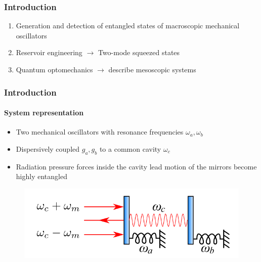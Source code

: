 \documentclass[aspectratio=43]{beamer}
\begin{document}
\begin{frame}

	\frametitle{Introduction}

	\begin{enumerate}
		\item Generation and detection of entangled states of macroscopic mechanical oscillators
		\item Reservoir engineering $\longrightarrow$ Two-mode squeezed states
		\item Quantum optomechanics $\longrightarrow$ describe mesoscopic systems
	\end{enumerate}	
	
\end{frame}

\begin{frame}

	\frametitle{Introduction}
	\framesubtitle{System representation}
	
	\begin{itemize}
		\item Two mechanical oscillators with resonance frequencies $\omega_{a}, \omega_{b}$
		\item Dispersively coupled $g_{a}, g_{b}$ to a common cavity $\omega_{c}$
		\item Radiation pressure forces inside the cavity lead motion of the mirrors become highly entangled
	\end{itemize}

		\begin{figure}
			\includegraphics[width = 8 cm]{plots/plot_system.png}
		\end{figure}	

\end{frame}
\end{document}
